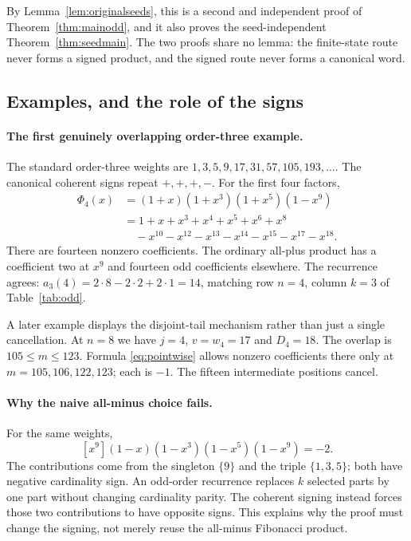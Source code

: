 \documentclass[11pt,letterpaper]{article}
\numberwithin{equation}{section}
\theoremstyle{definition}
\theoremstyle{remark}
\begin{document}
By Lemma~\ref{lem:originalseeds}, this is a second and independent proof of
Theorem~\ref{thm:mainodd}, and it also proves the seed-independent
Theorem~\ref{thm:seedmain}. The two proofs share no lemma: the finite-state
route never forms a signed product, and the signed route never forms a
canonical word.

\subsection{Examples, and the role of the signs}
\label{sec:allminus}

\paragraph{The first genuinely overlapping order-three example.}
The standard order-three weights are $1,3,5,9,17,31,57,105,193,\ldots$.
The canonical coherent signs repeat $+,+,+,-$. For the first four factors,
\begin{align*}
 \Phi_4(x)&=(1+x)(1+x^3)(1+x^5)(1-x^9)\\
 &=1+x+x^3+x^4+x^5+x^6+x^8\\
 &\quad-x^{10}-x^{12}-x^{13}-x^{14}-x^{15}-x^{17}-x^{18}.
\end{align*}
There are fourteen nonzero coefficients. The ordinary all-plus product has
a coefficient two at $x^9$ and fourteen odd coefficients elsewhere.
The recurrence agrees: $a_3(4)=2\cdot8-2\cdot2+2\cdot1=14$, matching row
$n=4$, column $k=3$ of Table~\ref{tab:odd}.

A later example displays the disjoint-tail mechanism rather than just a
single cancellation. At $n=8$ we have $j=4$, $v=w_4=17$ and $D_4=18$.
The overlap is $105\le m\le123$. Formula \eqref{eq:pointwise} allows
nonzero coefficients there only at $m=105,106,122,123$; each is $-1$.
The fifteen intermediate positions cancel.

\paragraph{Why the naive all-minus choice fails.}
For the same weights,
\[
 [x^9](1-x)(1-x^3)(1-x^5)(1-x^9)=-2 .
\]
The contributions come from the singleton $\{9\}$ and the triple
$\{1,3,5\}$; both have negative cardinality sign. An odd-order recurrence
replaces $k$ selected parts by one part without changing cardinality
parity. The coherent signing instead forces those two contributions to have
opposite signs. This explains why the proof must change the signing, not
merely reuse the all-minus Fibonacci product.
\end{document}
